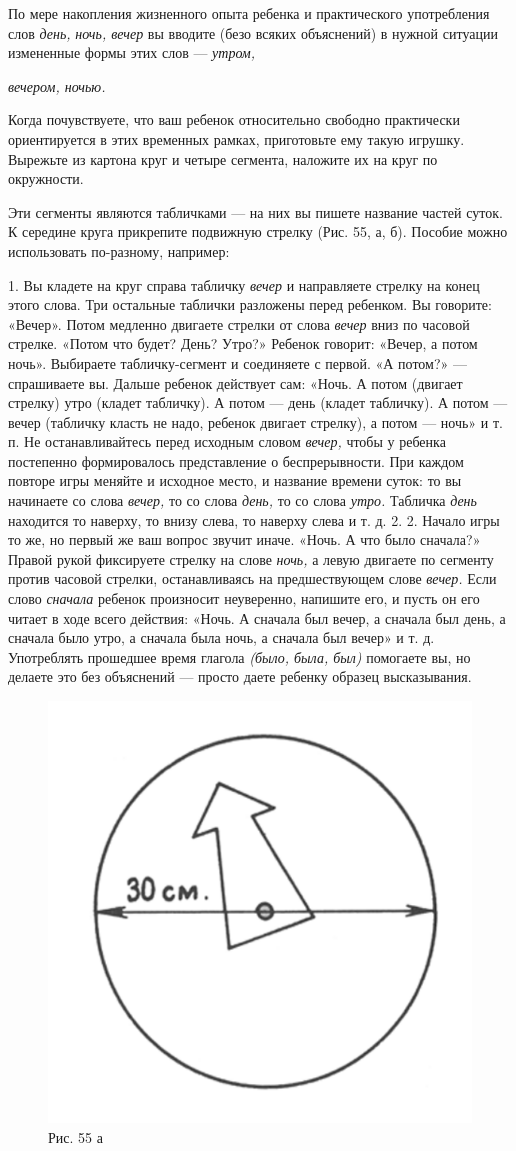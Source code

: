 \documentclass[a5paper]{book}
\renewcommand{\emph}[1]{\textit{#1}}
\begin{document}
По мере накопления жизненного опыта ребенка и практического употребления
слов \emph{день,} \emph{ночь, вечер} вы вводите (безо всяких объяснений)
в нужной ситуации измененные формы этих слов --- \emph{утром,}

\emph{вечером, ночью.}

Когда почувствуете, что ваш ребенок относительно свободно практически
ориентируется в этих временных рамках, приготовьте ему такую игрушку.
Вырежьте из картона круг и четыре сегмента, наложите их на круг по
окружности.

Эти сегменты являются табличками --- на них вы пишете название частей
суток. К середине круга прикрепите подвижную стрелку (Рис. 55, а, б).
Пособие можно использовать по-разному, например:

1. Вы кладете на круг справа табличку \emph{вечер} и направляете стрелку
на конец этого слова. Три остальные таблички разложены перед ребенком.
Вы говорите: «Вечер». Потом медленно двигаете стрелки от слова
\emph{вечер} вниз по часовой стрелке. «Потом что будет? День? Утро?»
Ребенок говорит: «Вечер, а потом ночь». Выбираете табличку-сегмент и
соединяете с первой. «А потом?» --- спрашиваете вы. Дальше ребенок
действует сам: «Ночь. А потом (двигает стрелку) утро (кладет табличку).
А потом --- день (кладет табличку). А потом --- вечер (табличку класть
не надо, ребенок двигает стрелку), а потом --- ночь» и т. п. Не
останавливайтесь перед исходным словом \emph{вечер,} чтобы у ребенка
постепенно формировалось представление о беспрерывности. При каждом
повторе игры меняйте и исходное место, и название времени суток: то вы
начинаете со слова \emph{вечер,} то со слова \emph{день,} то со слова
\emph{утро.} Табличка \emph{день} находится то наверху, то внизу слева,
то наверху слева и т. д. 2. 2. Начало игры то же, но первый же ваш
вопрос звучит иначе. «Ночь. А что было сначала?» Правой рукой фиксируете
стрелку на слове \emph{ночь,} а левую двигаете по сегменту против
часовой стрелки, останавливаясь на предшествующем слове \emph{вечер.}
Если слово \emph{сначала} ребенок произносит неуверенно, напишите его, и
пусть он его читает в ходе всего действия: «Ночь. А сначала был вечер, а
сначала был день, а сначала было утро, а сначала была ночь, а сначала
был вечер» и т. д. Употреблять прошедшее время глагола \emph{(было,
была, был)} помогаете вы, но делаете это без объяснений --- просто даете
ребенку образец высказывания.

\begin{figure}
\includegraphics[width=0.4\linewidth]{media/media/image51.png}
\caption*{Рис. 55 а}
\end{figure}
\end{document}
